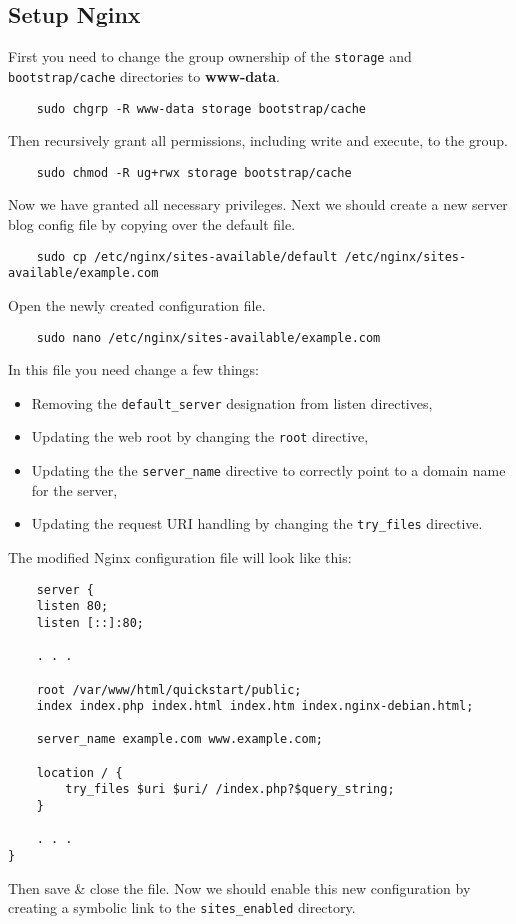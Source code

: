\documentclass[12pt]{article}
\begin{document}
\subsection{Setup Nginx}
First you need to change the group ownership of the \verb|storage| and \verb|bootstrap/cache| directories to \textbf{www-data}.
\begin{verbatim}
    sudo chgrp -R www-data storage bootstrap/cache
\end{verbatim}
Then recursively grant all permissions, including write and execute, to the group.
\begin{verbatim}
    sudo chmod -R ug+rwx storage bootstrap/cache
\end{verbatim}
Now we have granted all necessary privileges. Next we should create a new server blog config file by copying over the default file.
\begin{verbatim}
    sudo cp /etc/nginx/sites-available/default /etc/nginx/sites-available/example.com
\end{verbatim}
Open the newly created configuration file.
\begin{verbatim}
    sudo nano /etc/nginx/sites-available/example.com
\end{verbatim}
In this file you need change a few things:
\begin{itemize}
    \item Removing the \verb|default_server| designation from listen directives,
    \item Updating the web root by changing the \verb|root| directive,
    \item Updating the the \verb|server_name| directive to correctly point to a domain name for the server,
    \item Updating the request URI handling by changing the \verb|try_files| directive.
\end{itemize}
The modified Nginx configuration file will look like this:
\begin{verbatim}
    server {
    listen 80;
    listen [::]:80;

    . . .

    root /var/www/html/quickstart/public;
    index index.php index.html index.htm index.nginx-debian.html;

    server_name example.com www.example.com;

    location / {
        try_files $uri $uri/ /index.php?$query_string;
    }

    . . .
}
\end{verbatim}
Then save \& close the file. Now we should enable this new configuration by creating a symbolic link to the \verb|sites_enabled| directory.
\end{document}
